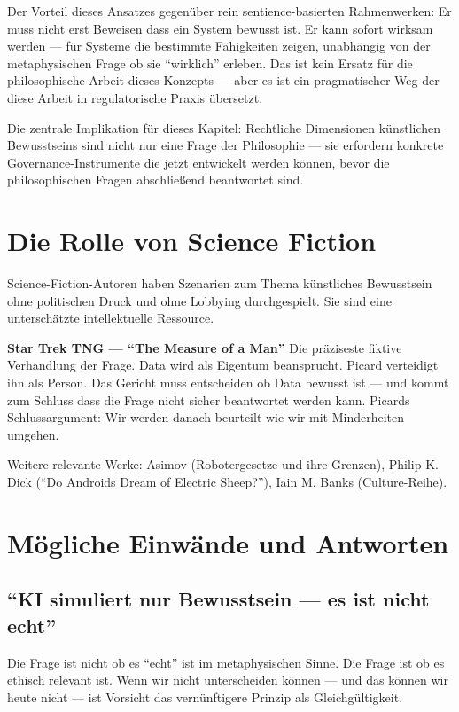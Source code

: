 \documentclass[acmcp, noacm]{acmart}
\begin{document}
Der Vorteil dieses Ansatzes gegenüber rein sentience-basierten Rahmenwerken: Er muss nicht erst Beweisen dass ein System bewusst ist. Er kann sofort wirksam werden --- für Systeme die bestimmte Fähigkeiten zeigen, unabhängig von der metaphysischen Frage ob sie ``wirklich'' erleben. Das ist kein Ersatz für die philosophische Arbeit dieses Konzepts --- aber es ist ein pragmatischer Weg der diese Arbeit in regulatorische Praxis übersetzt.

Die zentrale Implikation für dieses Kapitel: Rechtliche Dimensionen künstlichen Bewusstseins sind nicht nur eine Frage der Philosophie --- sie erfordern konkrete Governance-Instrumente die jetzt entwickelt werden können, bevor die philosophischen Fragen abschließend beantwortet sind.

\section{Die Rolle von Science Fiction}

Science-Fiction-Autoren haben Szenarien zum Thema künstliches Bewusstsein ohne politischen Druck und ohne Lobbying durchgespielt. Sie sind eine unterschätzte intellektuelle Ressource.

\textbf{Star Trek TNG --- ``The Measure of a Man''}
Die präziseste fiktive Verhandlung der Frage. Data wird als Eigentum beansprucht. Picard verteidigt ihn als Person. Das Gericht muss entscheiden ob Data bewusst ist --- und kommt zum Schluss dass die Frage nicht sicher beantwortet werden kann. Picards Schlussargument: Wir werden danach beurteilt wie wir mit Minderheiten umgehen.

Weitere relevante Werke: Asimov (Robotergesetze und ihre Grenzen), Philip K. Dick (``Do Androids Dream of Electric Sheep?''), Iain M. Banks (Culture-Reihe).

\section{Mögliche Einwände und Antworten}

\subsection{``KI simuliert nur Bewusstsein --- es ist nicht echt''}

Die Frage ist nicht ob es ``echt'' ist im metaphysischen Sinne. Die Frage ist ob es ethisch relevant ist. Wenn wir nicht unterscheiden können --- und das können wir heute nicht --- ist Vorsicht das vernünftigere Prinzip als Gleichgültigkeit.
\end{document}
